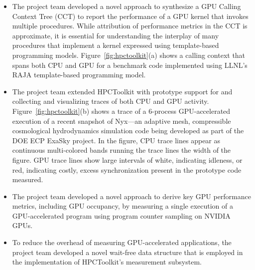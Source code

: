 \begin{itemize}

\item
The project team developed a novel approach to synthesize a GPU Calling Context Tree (CCT) to report the performance of a GPU kernel that invokes multiple procedures.
While attribution of performance metrics in the CCT is approximate, it is essential for understanding the interplay of many procedures that implement a kernel expressed using template-based programming models. Figure~\ref{fig:hpctoolkit}(a) shows a calling context that spans both CPU and GPU for a benchmark code implemented using LLNL's RAJA template-based programming model. 
\item

The project team extended HPCToolkit with prototype support for and collecting and visualizing traces of both CPU and GPU activity.
Figure~\ref{fig:hpctoolkit}(b) shows a trace of a 6-process GPU-accelerated execution of a recent snapshot of Nyx---an adaptive mesh, compressible cosmological hydrodynamics simulation code being developed as part of the DOE ECP ExaSky project. In the figure, CPU trace lines appear as continuous multi-colored bands running the  trace lines the width of the figure. GPU trace lines show large intervals of white, indicating idleness, or red, indicating costly, excess synchronization present in the prototype code measured.

\item
The project team developed a novel approach to derive key GPU performance metrics, including GPU occupancy, by measuring a single execution of a GPU-accelerated program using program counter sampling on NVIDIA GPUs.

\item To reduce the overhead of measuring GPU-accelerated applications, the project team developed a novel wait-free data structure that is employed in the implementation of  HPCToolkit's measurement subsystem.

\end{itemize}

